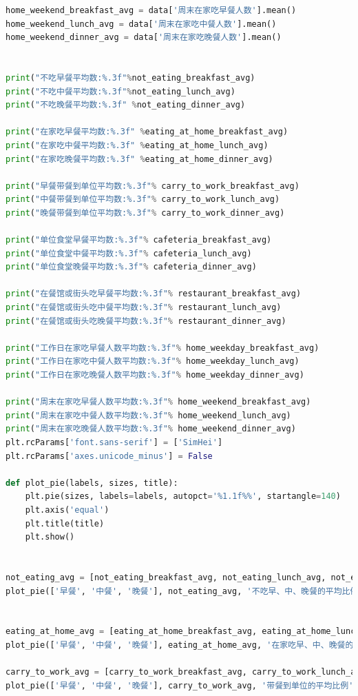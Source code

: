 \documentclass{cumcmthesis}
\begin{document}
\begin{appendices}
\begin{lstlisting}[language=python]
home_weekend_breakfast_avg = data['周末在家吃早餐人数'].mean()
home_weekend_lunch_avg = data['周末在家吃中餐人数'].mean()
home_weekend_dinner_avg = data['周末在家吃晚餐人数'].mean()


print("不吃早餐平均数:%.3f"%not_eating_breakfast_avg)
print("不吃中餐平均数:%.3f"%not_eating_lunch_avg)
print("不吃晚餐平均数:%.3f" %not_eating_dinner_avg)

print("在家吃早餐平均数:%.3f" %eating_at_home_breakfast_avg)
print("在家吃中餐平均数:%.3f" %eating_at_home_lunch_avg)
print("在家吃晚餐平均数:%.3f" %eating_at_home_dinner_avg)

print("早餐带餐到单位平均数:%.3f"% carry_to_work_breakfast_avg)
print("中餐带餐到单位平均数:%.3f"% carry_to_work_lunch_avg)
print("晚餐带餐到单位平均数:%.3f"% carry_to_work_dinner_avg)

print("单位食堂早餐平均数:%.3f"% cafeteria_breakfast_avg)
print("单位食堂中餐平均数:%.3f"% cafeteria_lunch_avg)
print("单位食堂晚餐平均数:%.3f"% cafeteria_dinner_avg)

print("在餐馆或街头吃早餐平均数:%.3f"% restaurant_breakfast_avg)
print("在餐馆或街头吃中餐平均数:%.3f"% restaurant_lunch_avg)
print("在餐馆或街头吃晚餐平均数:%.3f"% restaurant_dinner_avg)

print("工作日在家吃早餐人数平均数:%.3f"% home_weekday_breakfast_avg)
print("工作日在家吃中餐人数平均数:%.3f"% home_weekday_lunch_avg)
print("工作日在家吃晚餐人数平均数:%.3f"% home_weekday_dinner_avg)

print("周末在家吃早餐人数平均数:%.3f"% home_weekend_breakfast_avg)
print("周末在家吃中餐人数平均数:%.3f"% home_weekend_lunch_avg)
print("周末在家吃晚餐人数平均数:%.3f"% home_weekend_dinner_avg)
plt.rcParams['font.sans-serif'] = ['SimHei']
plt.rcParams['axes.unicode_minus'] = False

def plot_pie(labels, sizes, title):
    plt.pie(sizes, labels=labels, autopct='%1.1f%%', startangle=140)
    plt.axis('equal')
    plt.title(title)
    plt.show()


not_eating_avg = [not_eating_breakfast_avg, not_eating_lunch_avg, not_eating_dinner_avg]
plot_pie(['早餐', '中餐', '晚餐'], not_eating_avg, '不吃早、中、晚餐的平均比例')


eating_at_home_avg = [eating_at_home_breakfast_avg, eating_at_home_lunch_avg, eating_at_home_dinner_avg]
plot_pie(['早餐', '中餐', '晚餐'], eating_at_home_avg, '在家吃早、中、晚餐的平均比例')

carry_to_work_avg = [carry_to_work_breakfast_avg, carry_to_work_lunch_avg, carry_to_work_dinner_avg]
plot_pie(['早餐', '中餐', '晚餐'], carry_to_work_avg, '带餐到单位的平均比例')



\end{lstlisting}
\end{appendices}
\end{document}
